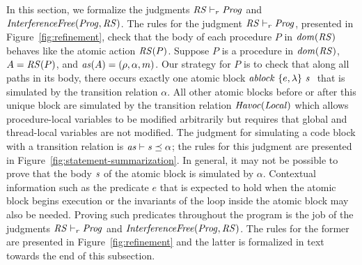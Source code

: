 In this section, we formalize the judgments $\mathit{RS} \vdash_r \mathit{Prog}$ and $\mathit{InterferenceFree}(\mathit{Prog},\mathit{RS})$.
The rules for the judgment $\mathit{RS} \vdash_r \mathit{Prog}$, presented in Figure~\ref{fig:refinement}, check that the body of 
each procedure $P$ in $\mathit{dom}(\mathit{RS})$ behaves like the atomic action $\mathit{RS}(P)$.  
Suppose $P$ is a procedure in $\mathit{dom}(\mathit{RS})$, $A = \mathit{RS}(P)$, and $\mathit{as}(A) = (\rho, \alpha, m)$.
Our strategy for $P$ is to check that along all paths in its body, there occurs exactly one atomic block 
$\mathit{ablock}\ {\{e,\lambda\}}\ {\mathit{s}}\ $ that is simulated by the transition relation $\alpha$.
All other atomic blocks before or after this unique block are simulated by the transition relation $\mathit{Havoc}(\mathit{Local})$ 
which allows procedure-local variables to be modified arbitrarily but requires that global and thread-local variables are not modified.
The judgment for simulating a code block with a transition relation is $\mathit{as} \vdash \mathit{s} \preceq \alpha$; the rules for this judgment 
are presented in Figure~\ref{fig:statement-summarization}.
In general, it may not be possible to prove that the body $\mathit{s}$ of the atomic block is simulated by $\alpha$.
Contextual information such as the predicate $e$ that is expected to hold when the atomic block begins execution or the invariants
of the loop inside the atomic block may also be needed.
Proving such predicates throughout the program is the job of the judgments $\mathit{RS} \vdash_r \mathit{Prog}$ and $\mathit{InterferenceFree}(\mathit{Prog}, \mathit{RS})$.
The rules for the former are presented in Figure~\ref{fig:refinement} and the latter is formalized in text towards the end of this 
subsection.

